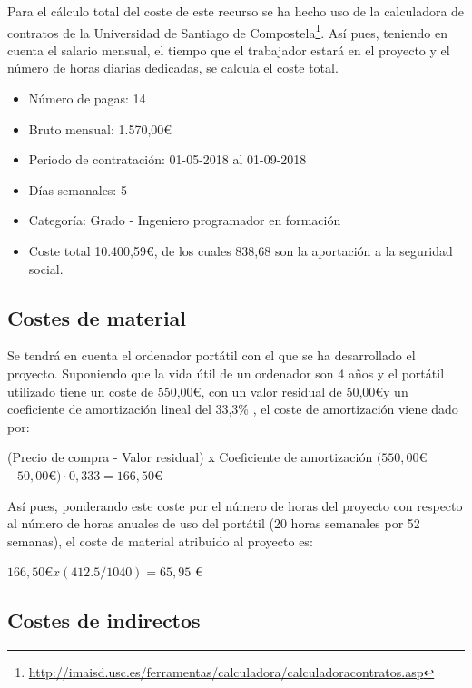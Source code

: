 Para el cálculo total del coste de este recurso se ha hecho uso de la calculadora de contratos de la Universidad de Santiago de Compostela\footnote{\url{http://imaisd.usc.es/ferramentas/calculadora/calculadoracontratos.asp}}. Así pues, teniendo en cuenta el salario mensual, el tiempo que el trabajador estará en el proyecto y el número de horas diarias dedicadas, se calcula el coste total. 
    \begin{itemize}
        \item Número de pagas: 14
        \item Bruto mensual: 1.570,00\euro
        \item Periodo de contratación: 01-05-2018 al 01-09-2018
        \item Días semanales: 5
        \item Categoría: Grado - Ingeniero programador en formación
        \item Coste total 10.400,59\euro, de los cuales 838,68 son la aportación a la seguridad social.
    \end{itemize}

\subsection{Costes de material}

Se tendrá en cuenta el ordenador portátil con el que se ha desarrollado el proyecto. Suponiendo que la vida útil de un ordenador son 4 años y el portátil utilizado tiene un coste de 550,00\euro, con un valor residual de 50,00\euro y un coeficiente de amortización lineal del 33,3\% , el coste de amortización viene dado por:
   \begin{center}
        (Precio de  compra - Valor residual) x Coeficiente de amortización
        $(550,00$\euro$ - 50,00$\euro$) \cdot 0,333 = 166,50$\euro   
    \end{center}
    Así pues, ponderando este coste por el número de horas del proyecto con respecto al número de horas anuales de uso del portátil (20 horas semanales por 52 semanas), el coste de material atribuido al proyecto es:
    \begin{center}
        $166,50$\euro$ x (412.5 / 1040) = 65,95$ \euro 
    \end{center}
    
\subsection{Costes de indirectos}

